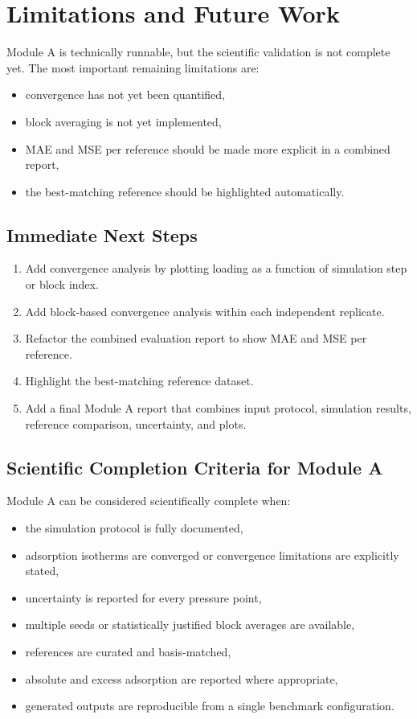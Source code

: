 \section{Limitations and Future Work}

Module A is technically runnable, but the scientific validation is not complete yet.
The most important remaining limitations are:

\begin{itemize}
    \item convergence has not yet been quantified,
    \item block averaging is not yet implemented,
    \item MAE and MSE per reference should be made more explicit in a combined report,
    \item the best-matching reference should be highlighted automatically.
\end{itemize}

\subsection{Immediate Next Steps}

\begin{enumerate}
    \item Add convergence analysis by plotting loading as a function of simulation step or block index.
    \item Add block-based convergence analysis within each independent replicate.
    \item Refactor the combined evaluation report to show MAE and MSE per reference.
    \item Highlight the best-matching reference dataset.
    \item Add a final Module A report that combines input protocol, simulation results, reference comparison, uncertainty, and plots.
\end{enumerate}

\subsection{Scientific Completion Criteria for Module A}

Module A can be considered scientifically complete when:

\begin{itemize}
    \item the simulation protocol is fully documented,
    \item adsorption isotherms are converged or convergence limitations are explicitly stated,
    \item uncertainty is reported for every pressure point,
    \item multiple seeds or statistically justified block averages are available,
    \item references are curated and basis-matched,
    \item absolute and excess adsorption are reported where appropriate,
    \item generated outputs are reproducible from a single benchmark configuration.
\end{itemize}
